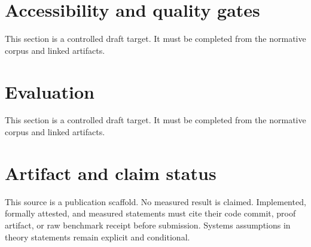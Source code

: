 \documentclass[11pt]{article}
\begin{document}
\section{Accessibility and quality gates}
This section is a controlled draft target. It must be completed from the normative corpus and linked artifacts.

\section{Evaluation}
This section is a controlled draft target. It must be completed from the normative corpus and linked artifacts.

\section*{Artifact and claim status}
This source is a publication scaffold. No measured result is claimed. Implemented,
formally attested, and measured statements must cite their code commit, proof
artifact, or raw benchmark receipt before submission. Systems assumptions in
theory statements remain explicit and conditional.
\end{document}
